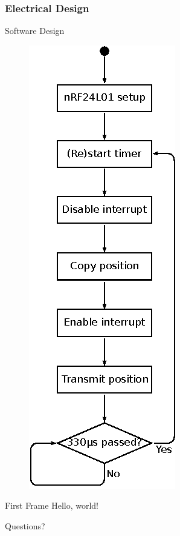 \documentclass[mathserif]{beamer}
\begin{document}
\begin{frame}[t]\frametitle{Electrical Design}
    
\end{frame}

\begin{frame}{Software Design}
	\begin{figure}
	\centering
	  \includegraphics[width=.25\linewidth]{graphics/joint_software_diagram}
	\end{figure}
\end{frame}





\begin{frame}{First Frame}
Hello, world!
\end{frame}



\begin{frame}[standout]
  Questions?
\end{frame}
\end{document}
